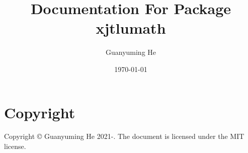 \documentclass{article}
\title{Documentation For Package xjtlumath}
\author{Guanyuming He}
\date{\today}
\newcommand{\mycprt}{Copyright \copyright{} Guanyuming He 2021-\the\year.}
\begin{document}
\maketitle

\vfill
\section*{Copyright}
\mycprt{} The document is licensed under the MIT license.

\cleardoublepage
{}
\tableofcontents






\end{document}
